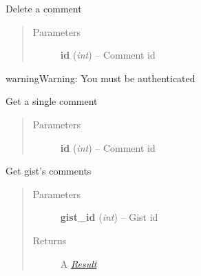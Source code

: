 \documentclass[letterpaper,10pt,english]{sphinxmanual}
\begin{document}
\begin{fulllineitems}

\begin{fulllineitems}
\label{gists:pygithub3.services.gists.Comments.delete}
Delete a comment
\begin{quote}\begin{description}
\item[{Parameters}] \leavevmode
\textbf{id} (\emph{int}) -- Comment id

\end{description}\end{quote}

\begin{notice}{warning}{Warning:}
You must be authenticated
\end{notice}

\end{fulllineitems}


\begin{fulllineitems}
\label{gists:pygithub3.services.gists.Comments.get}
Get a single comment
\begin{quote}\begin{description}
\item[{Parameters}] \leavevmode
\textbf{id} (\emph{int}) -- Comment id

\end{description}\end{quote}

\end{fulllineitems}


\begin{fulllineitems}
\label{gists:pygithub3.services.gists.Comments.list}
Get gist's comments
\begin{quote}\begin{description}
\item[{Parameters}] \leavevmode
\textbf{gist\_id} (\emph{int}) -- Gist id

\item[{Returns}] \leavevmode
A {\hyperref[result::doc]{\emph{Result}}}

\end{description}\end{quote}


\end{fulllineitems}
\end{fulllineitems}
\end{document}
